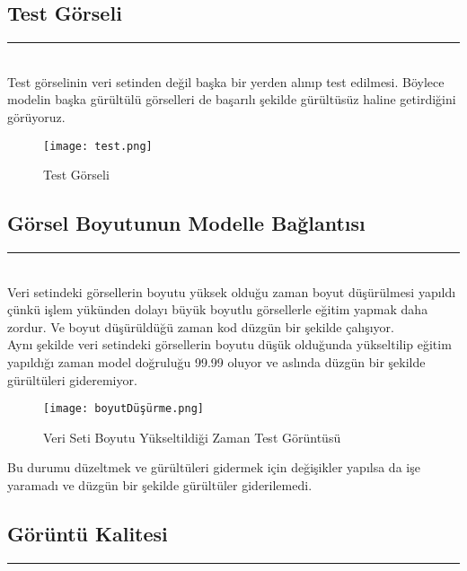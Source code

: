 \documentclass{article}
\begin{document}
\newpage
\subsection{Test Görseli}
\rule{\textwidth}{0.5pt}\\[10pt]

\noindent Test görselinin veri setinden değil başka bir yerden alınıp test edilmesi. Böylece modelin başka gürültülü görselleri de başarılı şekilde gürültüsüz haline getirdiğini görüyoruz.\\[10pt]

\renewcommand{\figurename}{Şekil}
\begin{figure}[htbp]
     \centering
\texttt{[image: test.png]}\centering 
  \caption{Test Görseli\cite{Pexels}}
  \label{fig:resim_etiketi}
\end{figure}

\subsection{Görsel Boyutunun Modelle Bağlantısı}
\rule{\textwidth}{0.5pt}\\[10pt]

\noindent Veri setindeki görsellerin boyutu yüksek olduğu zaman boyut düşürülmesi yapıldı çünkü işlem yükünden dolayı büyük boyutlu görsellerle eğitim yapmak daha zordur. Ve boyut düşürüldüğü zaman kod düzgün bir şekilde çalışıyor.\\[10pt]

\noindent Aynı şekilde veri setindeki görsellerin boyutu düşük olduğunda yükseltilip eğitim yapıldığı zaman model doğruluğu 99.99 oluyor ve aslında düzgün bir şekilde gürültüleri gideremiyor. \\[10pt] 

\renewcommand{\figurename}{Şekil}
\begin{figure}[htbp]
     \centering
\texttt{[image: boyutDüşürme.png]}\centering 
  \caption{Veri Seti Boyutu Yükseltildiği Zaman Test Görüntüsü }
  \label{fig:resim_etiketi}
\end{figure}

\noindent Bu durumu düzeltmek ve gürültüleri gidermek için değişikler yapılsa da işe yaramadı ve düzgün bir şekilde gürültüler giderilemedi. \\[10pt]


\subsection{Görüntü Kalitesi }
\rule{\textwidth}{0.5pt}\\[10pt]
\end{document}

